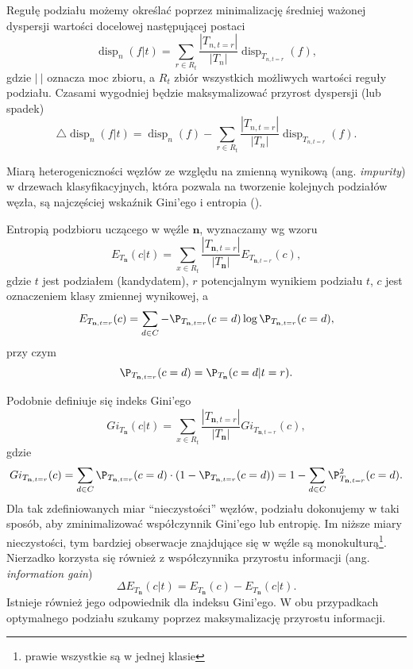 \documentclass[
]{book}
\theoremstyle{plain}
\theoremstyle{definition}
\theoremstyle{definition}
\theoremstyle{definition}
\theoremstyle{definition}
\theoremstyle{definition}
\theoremstyle{remark}
\begin{document}
Regułę podziału możemy określać poprzez minimalizację średniej ważonej dyspersji wartości docelowej następującej postaci
\begin{equation}\label{reg_podz}
        \operatorname{disp}_n(f|t)=\sum_{r\in R_t}\frac{|T_{n,t=r}|}{|T_n|}\operatorname{disp}_{T_{n,t=r}}(f),
\end{equation}
gdzie \(|\  |\) oznacza moc zbioru, a \(R_t\) zbiór wszystkich możliwych wartości reguły podziału. Czasami wygodniej będzie maksymalizować przyrost dyspersji (lub spadek)
\begin{equation}\label{przyrost}
        \bigtriangleup \operatorname{disp}_n(f|t)=\operatorname{disp}_n(f)-\sum_{r\in R_t}\frac{|T_{n,t=r}|}{|T_n|}\operatorname{disp}_{T_{n,t=r}}(f).
\end{equation}

Miarą heterogeniczności węzłów ze względu na zmienną wynikową (ang. \emph{impurity}) w drzewach klasyfikacyjnych, która pozwala na tworzenie kolejnych podziałów węzła, są najczęściej wskaźnik Gini'ego i entropia ().

Entropią podzbioru uczącego w węźle \(\mathbf{n}\), wyznaczamy wg wzoru
\begin{equation}
E_{T_{\mathbf{n}}}(c|t) = \sum_{x\in R_t} \frac{|T_{\mathbf{n}, t=r}|}{|T_{\mathbf{n}}|}E_{T_{\mathbf{n}, t=r}}(c),
\end{equation}
gdzie \(t\) jest podziałem (kandydatem), \(r\) potencjalnym wynikiem podziału \(t\), \(c\) jest oznaczeniem klasy zmiennej wynikowej, a
\begin{equation}
    E_{T_{\mathbf{n}, t=r}}(c) = \sum_{d\in C}-\P_{T_{\mathbf{n}, t=r}}(c=d)\log\P_{T_{\mathbf{n}, t=r}}(c=d),
\end{equation}
przy czym
\begin{equation}
    \P_{T_{\mathbf{n}, t=r}}(c=d)= \P_{T_{\mathbf{n}}}(c=d|t=r).
\end{equation}

Podobnie definiuje się indeks Gini'ego
\begin{equation}
Gi_{T_{\mathbf{n}}}(c|t) = \sum_{x\in R_t} \frac{|T_{\mathbf{n}, t=r}|}{|T_{\mathbf{n}}|}Gi_{T_{\mathbf{n}, t=r}}(c),
\end{equation}
gdzie
\begin{equation}
    Gi_{T_{\mathbf{n}, t=r}}(c) = \sum_{d\in C}\P_{T_{\mathbf{n}, t=r}}(c=d)\cdot(1-\P_{T_{\mathbf{n}, t=r}}(c=d))= 1-\sum_{d\in C}\P^2_{T_{\mathbf{n}, t=r}}(c=d).
\end{equation}
Dla tak zdefiniowanych miar ``nieczystości'' węzłów, podziału dokonujemy w taki sposób, aby zminimalizować współczynnik Gini'ego lub entropię. Im niższe miary nieczystości, tym bardziej obserwacje znajdujące się w węźle są monokulturą\footnote{prawie wszystkie są w jednej klasie}. Nierzadko korzysta się również z współczynnika przyrostu informacji (ang. \emph{information gain})
\begin{equation}
    \Delta E_{T_{\mathbf{n}}}(c|t)=E_{T_{\mathbf{n}}}(c)-E_{T_{\mathbf{n}}}(c|t).
\end{equation}
Istnieje również jego odpowiednik dla indeksu Gini'ego. W obu przypadkach optymalnego podziału szukamy poprzez maksymalizację przyrostu informacji.
\end{document}
